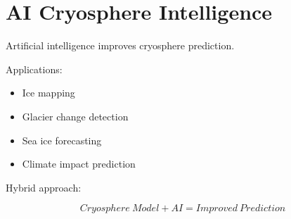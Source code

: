 \section{AI Cryosphere Intelligence}


Artificial intelligence improves cryosphere prediction.



Applications:


\begin{itemize}

\item Ice mapping

\item Glacier change detection

\item Sea ice forecasting

\item Climate impact prediction

\end{itemize}



Hybrid approach:


\[
Cryosphere\ Model+AI
=
Improved\ Prediction
\]

